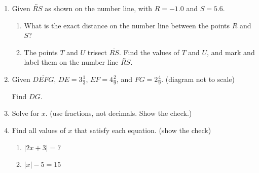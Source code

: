 \begin{enumerate}
\item Given $\overleftrightarrow{RS}$ as shown on the number line, with $R=-1.0$ and $S=5.6$. \par \medskip
  \begin{enumerate}
    \item What is the exact distance on the number line between the points $R$ and $S$? \vspace{2cm} 
    \item The points $T$ and $U$ trisect $\overline{RS}$. Find the values of $T$ and $U$, and mark and label them on the number line $\overleftrightarrow{RS}$. 
  \end{enumerate} \vspace{3cm}  

\newpage
\item Given $\overline{DEFG}$, $DE=3 \frac{1}{3}$, $EF=4 \frac{2}{9}$, and $FG= 2 \frac{4}{9}$. (diagram not to scale) \par \smallskip
  Find ${DG}$. \bigskip
  \begin{center}
  \end{center} \vspace{4cm}

\item Solve for $x$. (use fractions, not decimals. Show the check.)
\begin{enumerate}
\end{enumerate} \vspace{6cm}

\item Find all values of $x$ that satisfy each equation. (show the check) \bigskip
  \begin{multicols}{2} 
    \begin{enumerate}
      \item $|2x+3|=7$
      \item $|x|-5=15$
    \end{enumerate}
  \end{multicols}


\end{enumerate}
